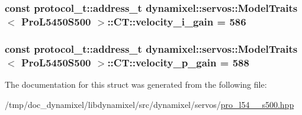 \subsubsection[{velocity\+\_\+i\+\_\+gain}]{\setlength{\rightskip}{0pt plus 5cm}const {\bf protocol\+\_\+t\+::address\+\_\+t} {\bf dynamixel\+::servos\+::\+Model\+Traits}$<$ {\bf Pro\+L5450\+S500} $>$\+::C\+T\+::velocity\+\_\+i\+\_\+gain = 586\hspace{0.3cm}{\ttfamily [static]}}\label{structdynamixel_1_1servos_1_1_model_traits_3_01_pro_l5450_s500_01_4_1_1_c_t_ae7bb82fa0cd9843bdba0b103a2fdfc88}
\hypertarget{structdynamixel_1_1servos_1_1_model_traits_3_01_pro_l5450_s500_01_4_1_1_c_t_a908357245724f3ef69886a072fbca951}{}
\subsubsection[{velocity\+\_\+p\+\_\+gain}]{\setlength{\rightskip}{0pt plus 5cm}const {\bf protocol\+\_\+t\+::address\+\_\+t} {\bf dynamixel\+::servos\+::\+Model\+Traits}$<$ {\bf Pro\+L5450\+S500} $>$\+::C\+T\+::velocity\+\_\+p\+\_\+gain = 588\hspace{0.3cm}{\ttfamily [static]}}\label{structdynamixel_1_1servos_1_1_model_traits_3_01_pro_l5450_s500_01_4_1_1_c_t_a908357245724f3ef69886a072fbca951}


The documentation for this struct was generated from the following file\+:\begin{DoxyCompactItemize}
\item 
/tmp/doc\+\_\+dynamixel/libdynamixel/src/dynamixel/servos/\hyperlink{pro__l54__50__s500_8hpp}{pro\+\_\+l54\+\_\+\_\+s500.\+hpp}\end{DoxyCompactItemize}
